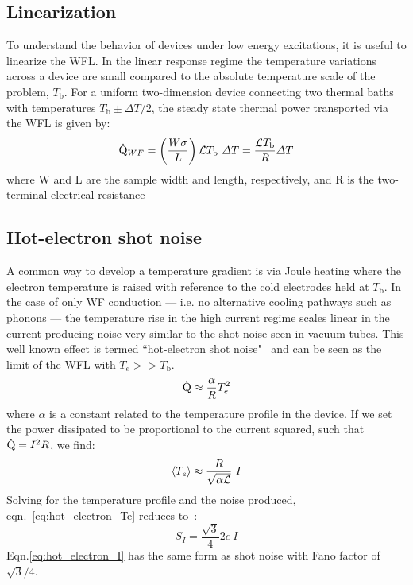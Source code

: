 \subsection{Linearization}
To understand the behavior of devices under low energy excitations, it is useful to linearize the WFL. In the linear response regime the temperature variations across a device are small compared to the absolute temperature scale of the problem, $T_\mathrm{b}$. For a uniform two-dimension device connecting two thermal baths with temperatures $T_\mathrm{b} \pm\Delta T/2$, the steady state thermal power transported via the WFL is given by:
\begin{equation}\label{eq:QWF}
\dot{\mathrm{Q}}_{WF} = \left(\frac{W\sigma}{L}\right)\mathcal{L} T_\mathrm{b}~\Delta T = \frac{\mathcal{L} T_\mathrm{b}}{R}\Delta T
\end{equation}
where W and L are the sample width and length, respectively, and R is the two-terminal electrical resistance
\subsection{Hot-electron shot noise}
A common way to develop a temperature gradient is via Joule heating where the electron temperature is raised with reference to the cold electrodes held at $T_\mathrm{b}$. In the case of only WF conduction --- i.e. no alternative cooling pathways such as phonons --- the temperature rise in the high current regime scales linear in the current producing noise very similar to the shot noise seen in vacuum tubes. This well known effect is termed ``hot-electron shot noise"~\cite{steinbach_observation_1996,blanter_shot_2000,de_jong_semiclassical_1996} and can be seen as the limit of the WFL with $T_e >> T_\mathrm{b}$.
\begin{equation}\label{eq:hot_electron_Q}
\dot{\mathrm{Q}} \approx \frac{\alpha\sl}{R}T_e^2
\end{equation}
where $\alpha$ is a constant related to the temperature profile in the device. If we set the power dissipated to be proportional to the current squared, such that $\dot{\mathrm{Q}} = I^2R$, we find:
\begin{equation}\label{eq:hot_electron_Te}
\langle T_e\rangle \approx \frac{R}{\sqrt{\alpha\mathcal{L}}}~I
\end{equation}
Solving for the temperature profile and the noise produced, eqn.~\ref{eq:hot_electron_Te} reduces to~\cite{martinez??}:
\begin{equation}\label{eq:hot_electron_I}
S_I = \frac{\sqrt{3}}{4}2e~I
\end{equation}
Eqn.\ref{eq:hot_electron_I} has the same form as shot noise with Fano factor of $\sqrt{3}/4$.

